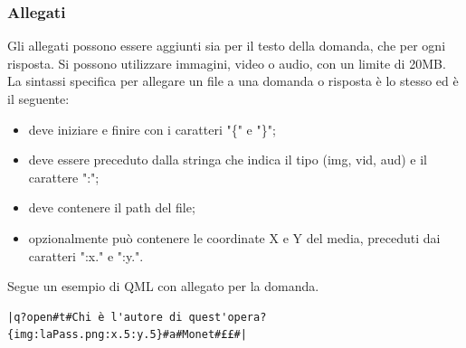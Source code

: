 \documentclass[a4paper, titlepage]{article}
\begin{document}
	\subsubsection{Allegati}
	Gli allegati possono essere aggiunti sia per il testo della domanda, che per ogni risposta.
	Si possono utilizzare immagini, video o audio, con un limite di 20MB.
	La sintassi specifica per allegare un file a una domanda o risposta è lo stesso ed è il seguente:
	\begin{itemize}
		\item deve iniziare e finire con i caratteri "\{" e "\}";
		\item deve essere preceduto dalla stringa che indica il tipo (img, vid, aud) e il carattere ":";
		\item deve contenere il path del file;
		\item opzionalmente può contenere le coordinate X e Y del media, preceduti dai caratteri ":x." e ":y.".
	\end{itemize}
	Segue un esempio di QML con allegato per la domanda.
	\begin{verbatim}|q?open#t#Chi è l'autore di quest'opera?{img:laPass.png:x.5:y.5}#a#Monet#££#|\end{verbatim}
	
\end{document}
